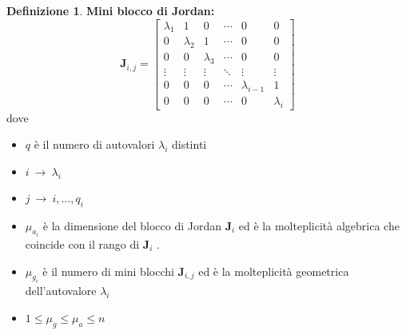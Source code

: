 \documentclass[a4paper]{article}
\renewcommand{\vec}{\bm}
\theoremstyle{definition}
\newtheorem{defn}{Definizione}[subsection]
\begin{document}
\begin{defn}
			
			\textbf{Mini blocco di Jordan:}
			\[
				\vec{J}_{i,j} =
				\begin{bmatrix}
					\lambda_1 & 1 & 0 & \cdots & 0 & 0 \\
					0 & \lambda_2 & 1 & \cdots & 0 & 0 \\
					0 & 0 & \lambda_3 & \cdots & 0 & 0 \\
					\vdots & \vdots & \vdots & \ddots & \vdots & \vdots \\
					0 & 0 & 0 & \cdots & \lambda_{i-1} & 1 \\
					0 & 0 & 0 & \cdots & 0 & \lambda_i
				\end{bmatrix}
			\]
			dove
			\begin{itemize}
				\item $ q $ è il numero di autovalori $ \lambda_i $ distinti
				\item $ i\ \rightarrow\ \lambda_i $
				\item $ j\ \rightarrow\ i,\dots, q_i $
				\item $ \mu_{a_i} $ è la dimensione del blocco di Jordan $ \vec{J}_i $ ed è la molteplicità algebrica che coincide con il rango di $ \vec{J}_i $ .
				\item $ \mu_{g_i} $ è il numero di mini blocchi $ \vec{J}_{i,j} $ ed è la molteplicità geometrica dell'autovalore $ \lambda_i $
				\item $ 1 \leq \mu_g \leq \mu_a \leq n $
			\end{itemize}
		\end{defn}
			
\end{document}

